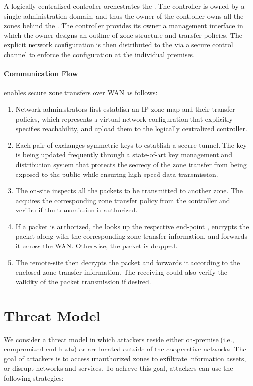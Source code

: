 A logically centralized controller orchestrates the \tps. The controller is owned
by a single administration domain, and thus the owner of the controller owns all
the zones behind the \tps. The controller provides its owner a management interface
in which the owner designs an outline of zone structure and transfer policies. The
explicit network configuration is then distributed to the \tps via a secure control
channel to enforce the configuration at the individual premises.

\paragraph{Communication Flow}

\name enables secure zone transfers over WAN as follows:

\begin{enumerate}
	\item Network administrators first establish an IP-zone map and their transfer
	      policies, which represents a virtual network configuration that explicitly
	      specifies reachability, and upload them to the logically centralized
	      controller.
	\item Each pair of \tps exchanges symmetric keys to establish a secure tunnel.
	      The key is being updated frequently through a state-of-art key management and
	      distribution system that protects the secrecy of the zone transfer from
	      being exposed to the public while ensuring high-speed data transmission.
	\item The on-site \tp inspects all the packets to be transmitted to another zone.
	      The \tp acquires the corresponding zone transfer policy from the controller
	      and verifies if the transmission is authorized.
	\item If a packet is authorized, the \tp looks up the respective end-point \tp,
	      encrypts the packet along with the corresponding zone transfer information,
	      and forwards it across the WAN. Otherwise, the packet is dropped.
	\item The remote-site \tp then decrypts the packet and forwards it according to
	      the enclosed zone transfer information. The receiving \tp could also verify
	      the validity of the packet transmission if desired.
\end{enumerate}


\section{Threat Model}
\label{sec:threatmodel}
We consider a threat model in which attackers reside either on-premise (i.e., compromised
end hosts) or are located
outside of the cooperative networks. The goal of attackers is to access unauthorized zones
to exfiltrate information assets, or disrupt networks and services. To achieve this goal,
attackers can use the following strategies:

